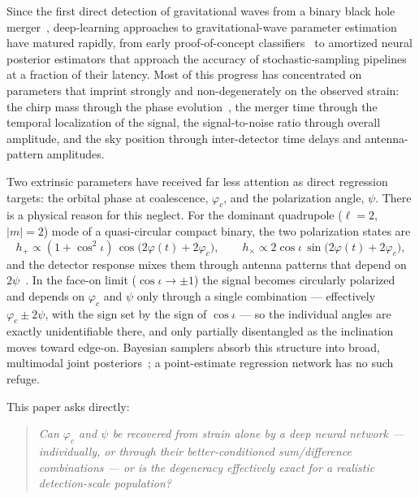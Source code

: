 Since the first direct detection of gravitational waves from a binary black hole merger~\citep{abbott2016gw150914}, deep-learning approaches to gravitational-wave parameter estimation have matured rapidly, from early proof-of-concept classifiers~\citep{george2018deep} to amortized neural posterior estimators that approach the accuracy of stochastic-sampling pipelines~\citep{gabbard2022vitamin,dax2021dingo} at a fraction of their latency.
Most of this progress has concentrated on parameters that imprint strongly and non-degenerately on the observed strain: the chirp mass through the phase evolution~\citep{cutler1994gw}, the merger time through the temporal localization of the signal, the signal-to-noise ratio through overall amplitude, and the sky position through inter-detector time delays and antenna-pattern amplitudes.

Two extrinsic parameters have received far less attention as direct regression targets: the orbital phase at coalescence, $\varphi_c$, and the polarization angle, $\psi$.
There is a physical reason for this neglect.
For the dominant quadrupole ($\ell=2$, $|m|=2$) mode of a quasi-circular compact binary, the two polarization states are
\begin{equation}
    h_+ \propto (1+\cos^2\iota)\,\cos\!\bigl(2\varphi(t)+2\varphi_c\bigr),
    \qquad
    h_\times \propto 2\cos\iota\,\sin\!\bigl(2\varphi(t)+2\varphi_c\bigr),
\end{equation}
and the detector response mixes them through antenna patterns that depend on $2\psi$~\citep{cutler1994gw,sathyaprakash2009physics}.
In the face-on limit ($\cos\iota \to \pm 1$) the signal becomes circularly polarized and depends on $\varphi_c$ and $\psi$ only through a single combination --- effectively $\varphi_c \pm 2\psi$, with the sign set by the sign of $\cos\iota$ --- so the individual angles are exactly unidentifiable there, and only partially disentangled as the inclination moves toward edge-on.
Bayesian samplers absorb this structure into broad, multimodal joint posteriors~\citep{veitch2015lalinference,ashton2019bilby}; a point-estimate regression network has no such refuge.

This paper asks directly:
\begin{quote}
\itshape Can $\varphi_c$ and $\psi$ be recovered from strain alone by a deep neural network --- individually, or through their better-conditioned sum/difference combinations --- or is the degeneracy effectively exact for a realistic detection-scale population?
\end{quote}

